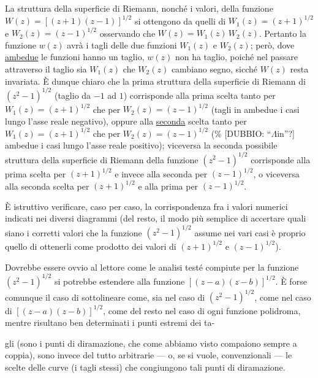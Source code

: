 \documentclass[11pt, a4paper]{book}
\numberwithin{equation}{section}
\begin{document}
La struttura della superficie di Riemann, nonché i valori, della funzione
$W(z) = \left[(z+1)(z-1)\right]^{1/2}$ si ottengono da quelli di $W_1(z)=(z+1)^{1/2}$
e $W_2(z)=(z-1)^{1/2}$ osservando che $W(z) = W_1(z)\,W_2(z)$. Pertanto la
funzione $w(z)$ avrà i tagli delle due funzioni $W_1(z)$ e $W_2(z)$; però,
dove \uline{ambedue} le funzioni hanno un taglio, $w(z)$ non ha taglio, poiché
nel passare attraverso il taglio sia $W_1(z)$ che $W_2(z)$ cambiano segno, sicché
$W(z)$ resta invariata. È dunque chiaro che la prima struttura della superficie
di Riemann di $(z^2-1)^{1/2}$ (taglio da $-1$ ad $1$) corrisponde alla prima
scelta tanto per $W_1(z) = (z+1)^{1/2}$ che per $W_2(z) = (z-1)^{1/2}$
(tagli in ambedue i casi lungo l'asse reale negativo), oppure alla
\uline{seconda} scelta tanto per $W_1(z) = (z+1)^{1/2}$ che per
$W_2(z) = (z-1)^{1/2}$ (\% [DUBBIO: ``$\Lambda$in''?] ambedue i casi lungo
l'asse reale positivo); viceversa la seconda possibile struttura della superficie
di Riemann della funzione $(z^2-1)^{1/2}$ corrisponde alla prima scelta per
$(z+1)^{1/2}$ e invece alla seconda per $(z-1)^{1/2}$, o viceversa alla seconda
scelta per $(z+1)^{1/2}$ e alla prima per $(z-1)^{1/2}$.

È istruttivo verificare, caso per caso, la corrispondenza fra i valori
numerici indicati nei diversi diagrammi (del resto, il modo più semplice di
accertare quali siano i corretti valori che la funzione $(z^2-1)^{1/2}$ assume
nei vari casi è proprio quello di ottenerli come prodotto dei valori di
$(z+1)^{1/2}$ e $(z-1)^{1/2}$).

Dovrebbe essere ovvio al lettore come le analisi testé compiute per la
funzione $(z^2-1)^{1/2}$ si potrebbe estendere alla funzione
$\left[(z-a)(z-b)\right]^{1/2}$. È forse comunque il caso di sottolineare come,
sia nel caso di $(z^2-1)^{1/2}$, come nel caso di $\left[(z-a)(z-b)\right]^{1/2}$,
come del resto nel caso di ogni funzione polidroma, mentre risultano ben determinati
i punti estremi dei ta-


gli (sono i punti di diramazione, che come abbiamo visto compaiono sempre
a coppia), sono invece del tutto arbitrarie --- o, se si vuole, convenzionali
--- le scelte delle curve (i tagli stessi) che congiungono tali punti di diramazione.
\end{document}
